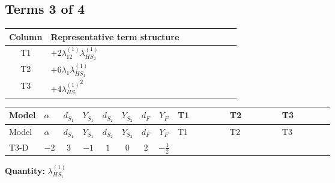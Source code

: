 \documentclass[8pt]{article}
\begin{document}
\begin{landscape}
\subsection*{Terms 3 of 4}
\begin{center}
\begin{tabular}{@{}c >{\raggedright\arraybackslash}p{0.82\linewidth}@{}}
\toprule
Column & Representative term structure \\
\midrule
T1 & \(\displaystyle +2 {\lambda_{12}^{(1)}} {\lambda_{HS_2}^{(1)}}\) \\
\midrule
T2 & \(\displaystyle +6 {\lambda_1} {\lambda_{HS_1}^{(1)}}\) \\
\midrule
T3 & \(\displaystyle +4 {\lambda_{HS_1}^{(1)}}^2\) \\
\midrule
\bottomrule
\end{tabular}
\end{center}
\smallskip
\tiny
\begin{longtable}{@{}llcccccc >{\raggedright\arraybackslash}p{0.21\linewidth} >{\raggedright\arraybackslash}p{0.21\linewidth} >{\raggedright\arraybackslash}p{0.21\linewidth}@{}}
\toprule
Model & $\alpha$ & $d_{S_1}$ & $Y_{S_1}$ & $d_{S_2}$ & $Y_{S_2}$ & $d_F$ & $Y_F$ & T1 & T2 & T3 \\
\midrule
\endfirsthead
\toprule
Model & $\alpha$ & $d_{S_1}$ & $Y_{S_1}$ & $d_{S_2}$ & $Y_{S_2}$ & $d_F$ & $Y_F$ & T1 & T2 & T3 \\
\midrule
\endhead
T3-D & $-2$ & $3$ & $-1$ & $1$ & $0$ & $2$ & $-\frac{1}{2}$ & \scriptsize\adjustbox{max width=\linewidth}{$\begin{gathered} +2 {\lambda_{12}^{(1)}} {\lambda_{HS_2}^{(1)}}\end{gathered}$} & \scriptsize\adjustbox{max width=\linewidth}{$\begin{gathered} +6 {\lambda_1} {\lambda_{HS_1}^{(1)}}\end{gathered}$} & \scriptsize\adjustbox{max width=\linewidth}{$\begin{gathered} +4 {\lambda_{HS_1}^{(1)}}^2\end{gathered}$} \\
\midrule
\bottomrule
\end{longtable}
\clearpage
\noindent\textbf{Quantity: }$\lambda_{HS_1}^{(1)}$\par\smallskip

\end{landscape}
\end{document}
